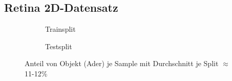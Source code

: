 \subsection{Retina 2D-Datensatz}
\begin{figure}[H]
\begin{minipage}{.5\textwidth}
\begin{subfigure}{\textwidth}

\caption{Trainsplit}
\label{pic:Haeuf-Train_205}
\end{subfigure}
\end{minipage}
\begin{minipage}{.5\textwidth}
\begin{subfigure}{\textwidth}

\caption{Testsplit}
\label{pic:Haeuf-Test_205}
\end{subfigure}
\end{minipage}
\caption{Anteil von Objekt (Ader) je Sample mit Durchschnitt je Split $\approx$ 11-12\%}
\label{pic:Haeuf_205}
\end{figure}

